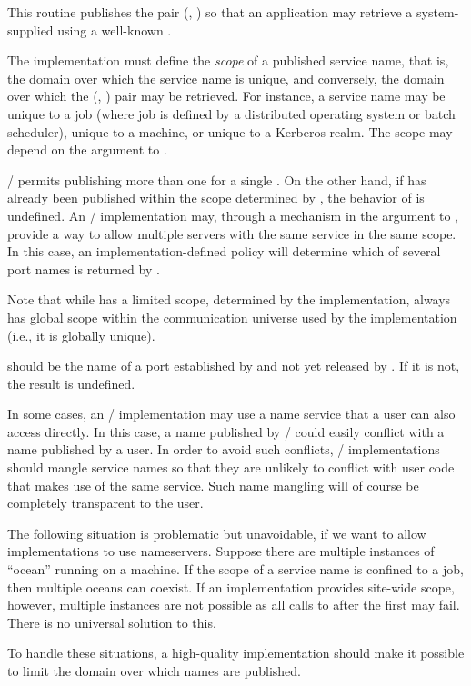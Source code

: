 This routine publishes the pair (,
) so that an application may retrieve a
system-supplied  using a well-known
.

The implementation must define the \emph{scope} of a published service name,
that is, the domain over which the
service name is unique, and conversely, the domain over which the
(, ) pair may be retrieved.  For instance, a
service name may be unique to a job  (where job is defined by a
distributed operating system or batch scheduler), unique to a machine,
or unique to a Kerberos realm.
The scope may depend on the  argument to .


\MPI/ permits publishing  more than one 
for a single .  On the other hand,
if  has already been published
within the scope determined by , the behavior of 
is undefined. An \MPI/ implementation may, through a mechanism in
the  argument
to ,  provide a way to allow
multiple servers with the same service in the same
scope. In this case, an implementation-defined policy will
determine which of several port names is returned by .



Note that while  has a limited
scope, determined by the implementation, 
always has global scope within the communication universe used
by the implementation (i.e., it is globally unique).

 should be the name of a port established
by  and not yet
released by
. If it is not, the result is undefined.


\begin{implementors}
In some cases, an \MPI/ implementation may use a name service
that a user can also access directly. In this case, a name
published by \MPI/ could easily conflict with a name
published by a user. In order to avoid such
conflicts, \MPI/ implementations should mangle service names
so that they are unlikely to conflict with user code that
makes use of the same service. Such name mangling will
of course be completely transparent to the user.


The following situation is problematic but unavoidable, if
we want to allow implementations to use nameservers.
Suppose there are multiple instances of ``ocean'' running
on a machine. If the scope of a service name is confined to
a job, then multiple oceans can coexist. If an implementation
provides site-wide scope, however, multiple instances are
not possible as all calls to  after
the first may fail. There is no universal solution to this.

To handle these situations,
a high-quality implementation should make it possible to
limit the domain over which names are published.
\end{implementors}


